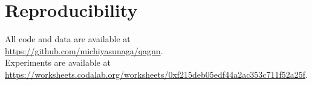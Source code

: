 \documentclass[11pt]{article}
\renewcommand\ttdefault{cmtt}
\begin{document}
\section*{Reproducibility}
\renewcommand\ttdefault{cmtt}
All code and data are available at\\
\url{https://github.com/michiyasunaga/qagnn}.\\
Experiments are available at\\
\url{https://worksheets.codalab.org/worksheets/0xf215deb05edf44a2ac353c711f52a25f}.






\end{document}
